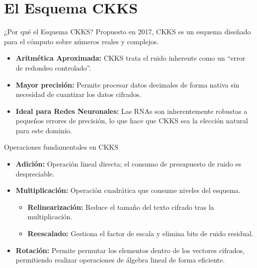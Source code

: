 \section{El Esquema CKKS}

\begin{frame}{¿Por qué el Esquema CKKS?}
    Propuesto en 2017, CKKS es un esquema diseñado para el cómputo sobre números reales y complejos.
    \vspace{0.3cm}
    \begin{itemize}
        \setlength{\itemsep}{12pt}
        \item \textbf{Aritmética Aproximada:} CKKS trata el ruido inherente como un ``error de redondeo controlado''.
        \item \textbf{Mayor precisión:} Permite procesar datos decimales de forma nativa sin necesidad de cuantizar los datos cifrados.
        \item \textbf{Ideal para Redes Neuronales:} Las RNAs son inherentemente robustas a pequeños errores de precisión, lo que hace que CKKS sea la elección natural para este dominio.
    \end{itemize}
\end{frame}

\begin{frame}{Operaciones fundamentales en CKKS}
    \begin{itemize}
        \setlength{\itemsep}{12pt}
        \item \textbf{Adición:} Operación lineal directa; el consumo de presupuesto de ruido es despreciable.
        \item \textbf{Multiplicación:} Operación cuadrática que consume niveles del esquema.
        \begin{itemize}
            \item \textbf{Relinearización:} Reduce el tamaño del texto cifrado tras la multiplicación.
            \item \textbf{Reescalado:} Gestiona el factor de escala y elimina bits de ruido residual.
        \end{itemize}
        \item \textbf{Rotación:} Permite permutar los elementos dentro de los vectores cifrados, permitiendo realizar operaciones de álgebra lineal de forma eficiente.
    \end{itemize}
\end{frame}

